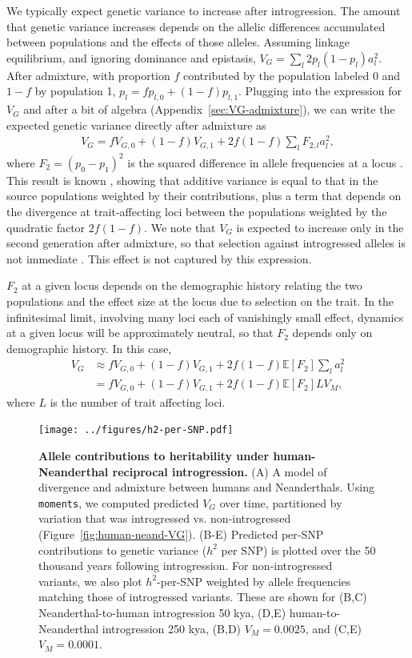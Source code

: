 \documentclass{article}
\newcommand{\moments}{\texttt{moments}\xspace}
\begin{document}
We typically expect genetic variance to increase after introgression. The
amount that genetic variance increases depends on the allelic differences
accumulated between populations and the effects of those alleles. Assuming
linkage equilibrium, and ignoring dominance and epistasis, \(V_G=\sum_l
2p_l(1-p_l)a_l^2\). After admixture, with proportion $f$ contributed by the
population labeled 0 and $1-f$ by population 1, \(p_l = fp_{l,0} +
(1-f)p_{l,1}\). Plugging into the expression for $V_G$ and after a bit of
algebra (Appendix~\ref{sec:VG-admixture}), we can write the expected genetic
variance directly after admixture as
\begin{align}
V_G = fV_{G,0} + (1-f) V_{G,1} + 2f(1-f)\sum_l F_{2,l} a_l^2,
\end{align}
where $F_2 = (p_0 - p_1)^2$ is the squared difference in allele frequencies at
a locus \citep{peter2016admixture}. This result is known
\citep[e.g.,][]{tufto2000quantitative}, showing that additive variance is equal
to that in the source populations weighted by their contributions, plus a term
that depends on the divergence at trait-affecting loci between the populations
weighted by the quadratic factor $2f(1-f)$. We note that $V_G$ is expected to
increase only in the second generation after admixture, so that selection
against introgressed alleles is not immediate \citep{veller2024stabilizing}.
This effect is not captured by this expression.

$F_2$ at a given locus depends on the demographic history
relating the two populations and the effect size at the locus due to selection
on the trait. In the infinitesimal limit, involving many loci each of
vanishingly small effect, dynamics at a given locus will be approximately
neutral, so that $F_2$ depends only on demographic history. In this case,
\begin{align} \label{eq:VG-admixture}
    V_G & \approx f V_{G,0} + (1-f) V_{G,1} + 2f(1-f)\mathbb{E}[F_2] \sum_l a_l^2 \\
    \nonumber
    & = f V_{G,0} + (1-f) V_{G,1} + 2f(1-f)\mathbb{E}[F_2] L V_M,
\end{align}
where $L$ is the number of trait affecting loci.


\begin{figure}[ht!]
    \centering
    \texttt{[image: ../figures/h2-per-SNP.pdf]}
    \caption{
        \textbf{Allele contributions to heritability under human-Neanderthal
        reciprocal introgression.}
        (A) A model of divergence and admixture between humans and
        Neanderthals. Using \moments, we computed predicted $V_G$ over time,
        partitioned by variation that was introgressed vs. non-introgressed
        (Figure~\ref{fig:human-neand-VG}).
        (B-E) Predicted per-SNP contributions to genetic variance ($h^2$ per
        SNP) is plotted over the 50 thousand years following introgression.
        For non-introgressed variants, we also plot $h^2$-per-SNP weighted by
        allele frequencies matching those of introgressed variants. These
        are shown for (B,C) Neanderthal-to-human introgression 50 kya,
        (D,E) human-to-Neanderthal introgression 250 kya, (B,D) $V_M=0.0025$,
        and (C,E) $V_M=0.0001$.
    }
    \label{fig:human-neand-h2}
\end{figure}
\end{document}
